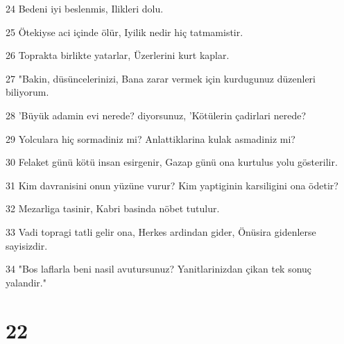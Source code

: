 \par 24 Bedeni iyi beslenmis, Ilikleri dolu.
\par 25 Ötekiyse aci içinde ölür, Iyilik nedir hiç tatmamistir.
\par 26 Toprakta birlikte yatarlar, Üzerlerini kurt kaplar.
\par 27 "Bakin, düsüncelerinizi, Bana zarar vermek için kurdugunuz düzenleri biliyorum.
\par 28 'Büyük adamin evi nerede? diyorsunuz, 'Kötülerin çadirlari nerede?
\par 29 Yolculara hiç sormadiniz mi? Anlattiklarina kulak asmadiniz mi?
\par 30 Felaket günü kötü insan esirgenir, Gazap günü ona kurtulus yolu gösterilir.
\par 31 Kim davranisini onun yüzüne vurur? Kim yaptiginin karsiligini ona ödetir?
\par 32 Mezarliga tasinir, Kabri basinda nöbet tutulur.
\par 33 Vadi topragi tatli gelir ona, Herkes ardindan gider, Önüsira gidenlerse sayisizdir.
\par 34 "Bos laflarla beni nasil avutursunuz? Yanitlarinizdan çikan tek sonuç yalandir."

\chapter{22}

